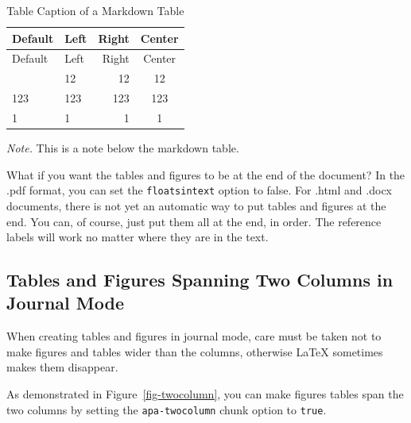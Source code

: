 \documentclass[
  jou,
  floatsintext,
  longtable,
  nolmodern,
  notxfonts,
  notimes,
  colorlinks=true,linkcolor=blue,citecolor=blue,urlcolor=blue]{apa7}
\begin{document}
\begin{ThreePartTable}

\begin{longtable}[]{@{}llrc@{}}
\caption{Table Caption of a Markdown
Table}\label{tbl-mymarkdowntable}\tabularnewline
\toprule\noalign{}
Default & Left & Right & Center \\
\midrule\noalign{}
\endfirsthead
\toprule\noalign{}
Default & Left & Right & Center \\
\midrule\noalign{}
\endhead
\bottomrule\noalign{}
\endlastfoot
12 & 12 & 12 & 12 \\
123 & 123 & 123 & 123 \\
1 & 1 & 1 & 1 \\
\end{longtable}

{\noindent \emph{Note.} This is a note below the markdown table.}

\end{ThreePartTable}

What if you want the tables and figures to be at the end of the
document? In the .pdf format, you can set the \texttt{floatsintext}
option to false. For .html and .docx documents, there is not yet an
automatic way to put tables and figures at the end. You can, of course,
just put them all at the end, in order. The reference labels will work
no matter where they are in the text.

\subsection{Tables and Figures Spanning Two Columns in Journal
Mode}\label{tables-and-figures-spanning-two-columns-in-journal-mode}

When creating tables and figures in journal mode, care must be taken not
to make figures and tables wider than the columns, otherwise \LaTeX
sometimes makes them disappear.

As demonstrated in Figure~\ref{fig-twocolumn}, you can make figures
tables span the two columns by setting the \texttt{apa-twocolumn} chunk
option to \texttt{true}.
\end{document}

